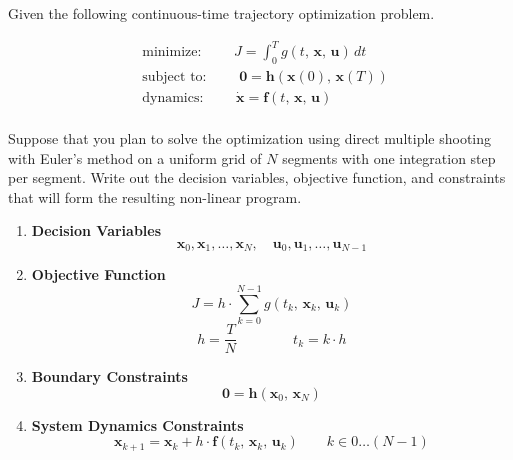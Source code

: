 Given the following continuous-time trajectory optimization problem.

\begin{align*}
  & \text{minimize: } \qquad J = \int_0^T \! g(t,\, \bm{x},\, \bm{u}) \, dt \\
  & \text{subject to: } \qquad \bm{0} = \bm{h}(\bm{x}(0), \, \bm{x}(T)) \\
  & \text{dynamics: } \qquad \dot{\bm{x}} = \bm{f}(t,\, \bm{x},\, \bm{u}) \\
\end{align*}

Suppose that you plan to solve the optimization using
direct multiple shooting with Euler's method
on a uniform grid of $N$ segments with one integration step per segment.
Write out the decision variables, objective function, and constraints
that will form the resulting non-linear program.

\begin{enumerate}
  \item \textbf{Decision Variables}
  \vspace{0.5em}
  \begin{equation*}
    \bm{x}_0, \bm{x}_1, \dots ,\bm{x}_N, \quad \bm{u}_0, \bm{u}_1, \dots, \bm{u}_{N-1}
  \end{equation*}
  \vspace{0.5em}
  \item \textbf{Objective Function}
  \vspace{0.5em}
  \begin{equation*}
    J = h \cdot \sum_{k=0}^{N-1} g(t_k,\,  \bm{x}_k,\,  \bm{u}_k)
  \end{equation*}
  \vspace{0.5em}
  \begin{equation*}
    h = \frac{T}{N}  \quad \quad \quad \quad t_k = k \cdot h
  \end{equation*}
  \vspace{0.5em}
  \item \textbf{Boundary Constraints}
  \vspace{0.5em}
  \begin{equation*}
    \bm{0} = \bm{h}(\bm{x}_0, \, \bm{x}_N)
  \end{equation*}
  \vspace{0.5em}
  \item \textbf{System Dynamics Constraints}
  \vspace{0.5em}
  \begin{equation*}
    \bm{x}_{k+1} = \bm{x}_k + h \cdot \bm{f}(t_k,\, \bm{x}_k,\, \bm{u}_k)
    \quad \quad k \in 0 \dots (N-1)
  \end{equation*}
  \vspace{0.5em}
\end{enumerate}



